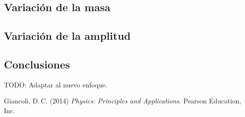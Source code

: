 \documentclass[twocolumn]{article}
\numberwithin{table}{section}
\begin{document}
\subsection{Variación de la masa}

\subsection{Variación de la amplitud}


\subsection{Conclusiones}

{\color{workblue} TODO\@: Adaptar al nuevo enfoque.}

\renewcommand{\refname}{Bibliografía}
\begin{thebibliography}{1}
  \bibitem{}
  Giancoli, D.\,C. (2014) \textit{Physics: Principles and
  Applications}. Pearson Education, Inc.
\end{thebibliography}
\end{document}
